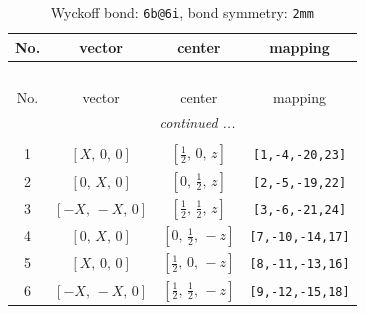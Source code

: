 \documentclass[fleqn,8pt]{jsarticle}
\begin{document}
\renewcommand{\arraystretch}{1.2}
\begin{longtable}{cccc}
\caption{Wyckoff bond: {\tt 6b@6i}, bond symmetry: {\tt 2mm}}
 \\
 \hline \hline
No. & vector & center & mapping \\ \hline \endfirsthead

\multicolumn{3}{l}{\tablename\ \thetable{}} \\
 \hline \hline
No. & vector & center & mapping \\ \hline \endhead

 \hline \hline
\multicolumn{3}{r}{\footnotesize\it continued ...} \\ \endfoot

 \hline \hline
\multicolumn{3}{r}{} \\ \endlastfoot

1 & $\left[ X,\, 0,\, 0 \right]$ & $\left[ \frac{1}{2},\, 0,\, z \right]$ & {\tt [1,-4,-20,23]} \\ \hline
2 & $\left[ 0,\, X,\, 0 \right]$ & $\left[ 0,\, \frac{1}{2},\, z \right]$ & {\tt [2,-5,-19,22]} \\ \hline
3 & $\left[ - X,\, - X,\, 0 \right]$ & $\left[ \frac{1}{2},\, \frac{1}{2},\, z \right]$ & {\tt [3,-6,-21,24]} \\ \hline
4 & $\left[ 0,\, X,\, 0 \right]$ & $\left[ 0,\, \frac{1}{2},\, - z \right]$ & {\tt [7,-10,-14,17]} \\ \hline
5 & $\left[ X,\, 0,\, 0 \right]$ & $\left[ \frac{1}{2},\, 0,\, - z \right]$ & {\tt [8,-11,-13,16]} \\ \hline
6 & $\left[ - X,\, - X,\, 0 \right]$ & $\left[ \frac{1}{2},\, \frac{1}{2},\, - z \right]$ & {\tt [9,-12,-15,18]} \\
\end{longtable}
\renewcommand{\arraystretch}{1.2}
\end{document}
